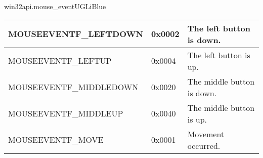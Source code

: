\documentclass[a4paper,10pt,cours,firamath]{nsi}
\begin{document}
\begin{encadrecolore}{win32api.mouse\_event}{UGLiBlue}
\begin{center}
\begin{tabularx}{\textwidth}{|X|X|X|}
			\hline
			MOUSEEVENTF\_LEFTDOWN       & 
			0x0002                      & 
			The left button is down.                                                                                                                                                                                                                                                                                                                                                                                                                                                          \\\hline
			MOUSEEVENTF\_LEFTUP         & 
			0x0004                      & 
			The left button is up.                                                                                                                                                                                                                                                                                                                                                                                                                                                            \\\hline
			MOUSEEVENTF\_MIDDLEDOWN     & 
			0x0020                      & 
			The middle button is down.                                                                                                                                                                                                                                                                                                                                                                                                                                                        \\\hline
			MOUSEEVENTF\_MIDDLEUP       & 
			0x0040                      & 
			The middle button is up.                                                                                                                                                                                                                                                                                                                                                                                                                                                          \\\hline
			MOUSEEVENTF\_MOVE           & 
			0x0001                      & 
			Movement occurred.                                                                                                                                                                                                                                                                                                                                                                                                                                                                \\\hline

\end{tabularx}
\end{center}
\end{encadrecolore}
\end{document}
